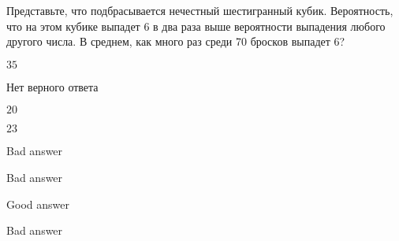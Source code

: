 
\begin{question}
Представьте, что подбрасывается нечестный шестигранный кубик.
Вероятность, что на этом кубике выпадет 6 в два раза выше вероятности выпадения любого другого числа.
В среднем, как много раз среди 70 бросков выпадет 6?
\begin{answerlist}
  \item \(35\)
  \item Нет верного ответа
  \item \(20\)
  \item \(23\)
\end{answerlist}
\end{question}

\begin{solution}
\begin{answerlist}
  \item Bad answer
  \item Bad answer
  \item Good answer
  \item Bad answer
\end{answerlist}
\end{solution}

